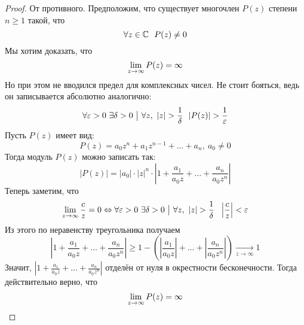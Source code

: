 \begin{proof}
	От противного. Предположим, что существует многочлен $P(z)$ степени $n \ge 1$ такой, что
	\[
		\forall z \in \mathbb{C}\ \ P(z) \neq 0
	\]
	Мы хотим доказать, что
	\[
		\lim\limits_{z \to \infty} P(z) = \infty
	\]
	Но при этом не вводился предел для комплексных чисел. Не стоит бояться, ведь он записывается абсолютно аналогично:
	\[
		\forall \varepsilon > 0\ \exists \delta > 0 \ \big|\  \forall z,\ |z| > \frac{1}{\delta}\ \ |P(z)| > \frac{1}{\varepsilon}
	\]
	Пусть $P(z)$ имеет вид:
	\[
		P(z) = a_0 z^n + a_1 z^{n - 1} + \ldots + a_n,\ a_0 \neq 0
	\]
	Тогда модуль $P(z)$ можно записать так:
	\[
		|P(z)| = |a_0| \cdot |z|^n \cdot \left|1 + \frac{a_1}{a_0 z} + \ldots + \frac{a_n}{a_0 z^n}\right|
	\]
	Теперь заметим, что
	\[
		\lim\limits_{z \to \infty} \frac{c}{z} = 0 \Leftrightarrow \forall \varepsilon > 0\ \exists \delta > 0 \ \big|\  \forall z,\ |z| > \frac{1}{\delta}\ \ \left|\frac{c}{z}\right| < \varepsilon
	\]
	Из этого по неравенству треугольника получаем
	\[
		\left|1 + \frac{a_1}{a_0 z} + \ldots + \frac{a_n}{a_0 z^n}\right| \ge 1 - \left(\left|\frac{a_1}{a_0 z}\right| + \ldots + \left|\frac{a_n}{a_0 z^n}\right|\right) \xrightarrow[z \to \infty]{} 1
	\]
	Значит, $\left|1 + \frac{a_1}{a_0 z} + \ldots + \frac{a_n}{a_0 z^n}\right|$ отделён от нуля в окрестности бесконечности. Тогда действительно верно, что
	\[
		\lim\limits_{z \to \infty} P(z) = \infty
	\]
	

\end{proof}
